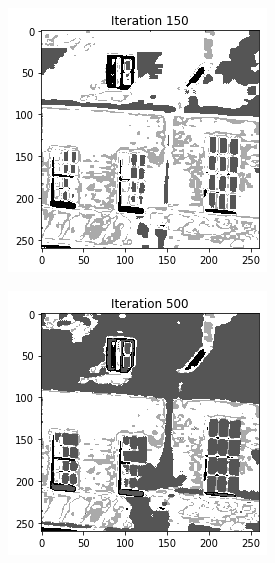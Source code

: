 \documentclass[11pt]{article}
\begin{document}
\begin{figure}[!htb]
\begin{center}
\begin{multicols}{5}
	\includegraphics[height = \linewidth]{house_150}\par
	\includegraphics[height = \linewidth]{house_500}\

\end{multicols}
\end{center}
\end{figure}
\end{document}
